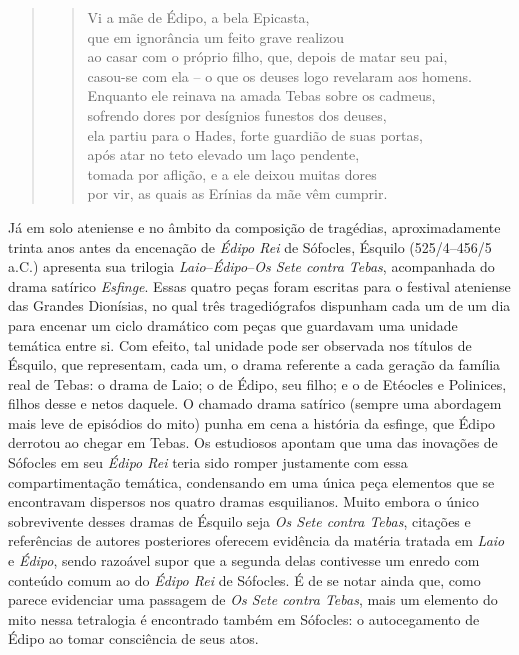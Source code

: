 \begin{quote}
\begin{verse}
Vi a mãe de Édipo, a bela Epicasta,\\
que em ignorância um feito grave realizou\\
ao casar com o próprio filho, que,\qb{} depois de matar seu pai,\\
casou-se com ela -- o que os deuses\qb{} logo revelaram aos homens.\\
Enquanto ele reinava na amada Tebas\qb{} sobre os cadmeus,\\
sofrendo dores por desígnios\qb{} funestos dos deuses,\\
ela partiu para o Hades,\qb{} forte guardião de suas portas,\\
após atar no teto elevado um laço pendente,\\
tomada por aflição, e a ele\qb{} deixou muitas dores\\
por vir, as quais as Erínias da mãe\qb{} vêm cumprir.
\end{verse}
\end{quote}


Já em solo ateniense e no âmbito da composição de tragédias,
aproximadamente trinta anos antes da encenação de \emph{Édipo Rei} de
Sófocles, Ésquilo (525/4--456/5 a.C.) apresenta sua trilogia
\emph{Laio}--\emph{Édipo}--\emph{Os Sete contra Tebas}, acompanhada
do drama satírico \emph{Esfinge}. Essas quatro peças foram escritas para
o festival ateniense das Grandes Dionísias, no qual três tragediógrafos
dispunham cada um de um dia para encenar um ciclo dramático com peças
que guardavam uma unidade temática entre si. Com efeito, tal unidade
pode ser observada nos títulos de Ésquilo, que representam, cada um, o
drama referente a cada geração da família real de Tebas: o drama de
Laio; o de Édipo, seu filho; e o de Etéocles e Polinices, filhos desse e
netos daquele. O chamado drama satírico (sempre uma abordagem mais leve
de episódios do mito) punha em cena a história da esfinge, que Édipo
derrotou ao chegar em Tebas. Os estudiosos apontam que uma das inovações
de Sófocles em seu \emph{Édipo Rei} teria sido romper justamente com
essa compartimentação temática, condensando em uma única peça elementos
que se encontravam dispersos nos quatro dramas esquilianos. Muito embora
o único sobrevivente desses dramas de Ésquilo seja \emph{Os Sete contra
Tebas}, citações e referências de autores posteriores oferecem evidência
da matéria tratada em \emph{Laio} e \emph{Édipo}, sendo razoável supor
que a segunda delas contivesse um enredo com conteúdo comum ao do
\emph{Édipo Rei} de Sófocles. É de se notar ainda que, como parece
evidenciar uma passagem de \emph{Os Sete contra Tebas}, mais um elemento
do mito nessa tetralogia é encontrado também em Sófocles: o
autocegamento de Édipo ao tomar consciência de seus atos.

